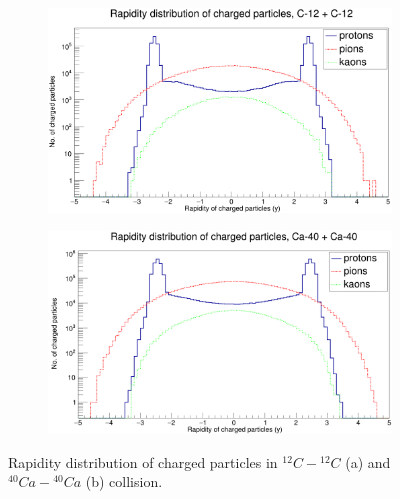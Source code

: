 \documentclass[12pt]{article}
\begin{document}
\begin{figure}[h]
\centering
\begin{subfigure}[h]{0.49\textwidth}
\centering
\includegraphics[width=\textwidth, height=0.33\textheight]{RapidityC12.png}
\caption{}
\end{subfigure}
\hfill
\begin{subfigure}[h]{0.49\textwidth}
\centering
\includegraphics[width=\textwidth, height=0.33\textheight]{RapidityCa40.png}
\caption{}
\end{subfigure}
\caption{Rapidity distribution of charged particles in $^{12}C-{^{12}C}$ (a) and $^{40}Ca-{^{40}Ca}$ (b) collision.}
\label{gen-rapidity}
\end{figure}
\end{document}
